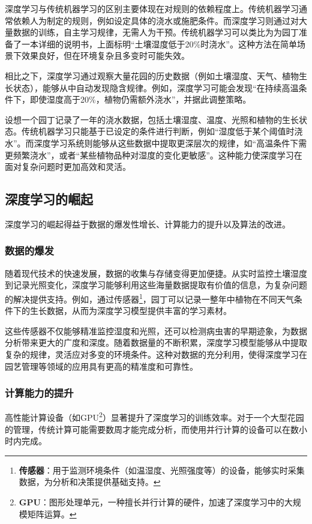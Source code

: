 深度学习与传统机器学习的区别主要体现在对规则的依赖程度上。传统机器学习通常依赖人为制定的规则，例如设定具体的浇水或施肥条件。而深度学习则通过对大量数据的训练，自主学习规律，无需人为干预。传统机器学习可以类比为为园丁准备了一本详细的说明书，上面标明“土壤湿度低于20\%时浇水”。这种方法在简单场景下效果良好，但在环境复杂且多变时可能失效。

相比之下，深度学习通过观察大量花园的历史数据（例如土壤湿度、天气、植物生长状态），能够从中自动发现隐含规律。例如，深度学习可能会发现“在持续高温条件下，即使湿度高于20\%，植物仍需额外浇水”，并据此调整策略。

设想一个园丁记录了一年的浇水数据，包括土壤湿度、温度、光照和植物的生长状态。传统机器学习只能基于已设定的条件进行判断，例如“湿度低于某个阈值时浇水”。而深度学习系统则能够从这些数据中提取更深层次的规律，如“高温条件下需更频繁浇水”，或者“某些植物品种对湿度的变化更敏感”。这种能力使深度学习在面对复杂问题时更加高效和灵活。
    
\subsection{深度学习的崛起}

深度学习的崛起得益于数据的爆发性增长、计算能力的提升以及算法的改进。

\subsubsection{数据的爆发}

随着现代技术的快速发展，数据的收集与存储变得更加便捷。从实时监控土壤湿度到记录光照变化，深度学习能够利用这些海量数据提取有价值的信息，为复杂问题的解决提供支持。例如，通过传感器\footnote{\textbf{传感器}：用于监测环境条件（如温湿度、光照强度等）的设备，能够实时采集数据，为分析和决策提供基础支持。}，园丁可以记录一整年中植物在不同天气条件下的生长数据，从而为深度学习模型提供丰富的学习素材。

这些传感器不仅能够精准监控湿度和光照，还可以检测病虫害的早期迹象，为数据分析带来更大的广度和深度。随着数据量的不断积累，深度学习模型能够从中提取复杂的规律，灵活应对多变的环境条件。这种对数据的充分利用，使得深度学习在园艺管理等领域的应用具有更高的精准度和可靠性。


\subsubsection{计算能力的提升}
高性能计算设备（如GPU\footnote{\textbf{GPU}：图形处理单元，一种擅长并行计算的硬件，加速了深度学习中的大规模矩阵运算。}）显著提升了深度学习的训练效率。对于一个大型花园的管理，传统计算可能需要数周才能完成分析，而使用并行计算的设备可以在数小时内完成。

